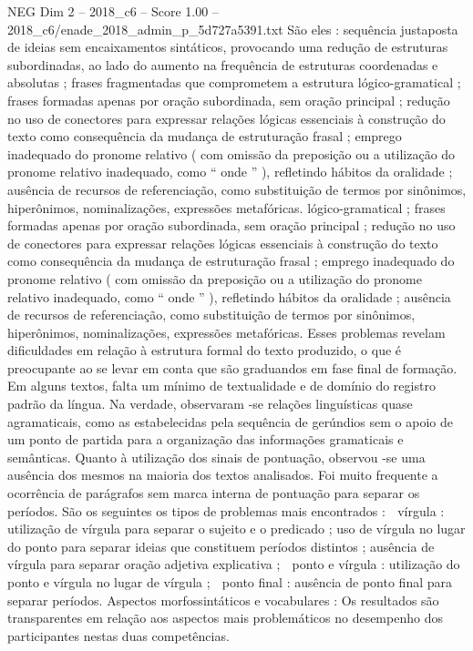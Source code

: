 \begin{textsample}{NEG Dim 2 – 2018\_c6 – Score 1.00 – 2018\_c6/enade\_2018\_admin\_p\_5d727a5391.txt}
São eles : sequência justaposta de ideias sem encaixamentos sintáticos, provocando uma redução de estruturas subordinadas, ao lado do aumento na frequência de estruturas coordenadas e absolutas ; frases fragmentadas que comprometem a estrutura lógico-gramatical ; frases formadas apenas por oração subordinada, sem oração principal ; redução no uso de conectores para expressar relações lógicas essenciais à construção do texto como consequência da mudança de estruturação frasal ; emprego inadequado do pronome relativo ( com omissão da preposição ou a utilização do pronome relativo inadequado, como “ onde ” ), refletindo hábitos da oralidade ; ausência de recursos de referenciação, como substituição de termos por sinônimos, hiperônimos, nominalizações, expressões metafóricas. lógico-gramatical ; frases formadas apenas por oração subordinada, sem oração principal ; redução no uso de conectores para expressar relações lógicas essenciais à construção do texto como consequência da mudança de estruturação frasal ; emprego inadequado do pronome relativo ( com omissão da preposição ou a utilização do pronome relativo inadequado, como “ onde ” ), refletindo hábitos da oralidade ; ausência de recursos de referenciação, como substituição de termos por sinônimos, hiperônimos, nominalizações, expressões metafóricas.
Esses problemas revelam dificuldades em relação à estrutura formal do texto produzido, o que é preocupante ao se levar em conta que são graduandos em fase final de formação.
Em alguns textos, falta um mínimo de textualidade e de domínio do registro padrão da língua.
Na verdade, observaram -se relações linguísticas quase agramaticais, como as estabelecidas pela sequência de gerúndios sem o apoio de um ponto de partida para a organização das informações gramaticais e semânticas.
Quanto à utilização dos sinais de pontuação, observou -se uma ausência dos mesmos na maioria dos textos analisados.
Foi muito frequente a ocorrência de parágrafos sem marca interna de pontuação para separar os períodos.
São os seguintes os tipos de problemas mais encontrados :  vírgula : utilização de vírgula para separar o sujeito e o predicado ; uso de vírgula no lugar do ponto para separar ideias que constituem períodos distintos ; ausência de vírgula para separar oração adjetiva explicativa ;  ponto e vírgula : utilização do ponto e vírgula no lugar de vírgula ;  ponto final : ausência de ponto final para separar períodos.
Aspectos morfossintáticos e vocabulares : Os resultados são transparentes em relação aos aspectos mais problemáticos no desempenho dos participantes nestas duas competências.

\end{textsample}

